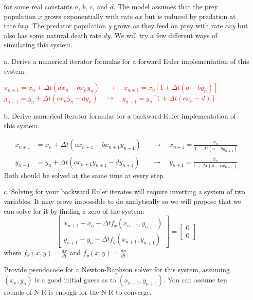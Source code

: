 \documentclass[11pt]{article}
\begin{document}
for some real constants $a$, $b$, $c$, and $d$.  The model assumes that the prey population $x$ grows exponentially with rate $ax$ but is reduced by predation at rate $bxy$.  The predator population $y$ grows as they feed on prey with rate $cxy$ but also has some natural death rate $dy$.  We will try a few different ways of simulating this system.  

a. Derive a numerical iterator formulas for a forward Euler implementation of this system.

\textcolor{red}{
$x_{n+1} = x_n + \Delta t (a x_n - b x_n y_n) \quad \rightarrow \quad x_{n+1} = x_n \left[1 + \Delta t (a - b y_n)\right]$\\
$y_{n+1} = y_n + \Delta t (c x_n y_n - d y_n) \quad \rightarrow \quad y_{n+1} = y_n \left[1 + \Delta t (c x_n - d)\right]$
}

b. Derive numerical iterator formulas for a backward Euler implementation of this system.

{\color{red}
\begin{align*}
x_{n+1} &= x_n + \Delta t (a x_{n+1} - b x_{n+1} y_{n+1})
  &&\rightarrow\quad x_{n+1} = \frac{x_n}{1 - \Delta t(a - b y_{n+1})}\\
y_{n+1} &= y_n + \Delta t (c x_{n+1} y_{n+1} - d y_{n+1})
  &&\rightarrow\quad y_{n+1} = \frac{y_n}{1 + \Delta t(d - c x_{n+1})}
\end{align*}
Both should be solved at the same time at every step.
}

c. Solving for your backward Euler iterates will require inverting a system of two variables.  It may prove impossible to do analytically so we will propose that we can solve for it by finding a zero of the system:
\[\left[ \begin{array}{c}x_{n+1} - x_n - \Delta t f_x(x_{n+1},y_{n+1})\\ y_{n+1} - y_n - \Delta t f_y(x_{n+1}, y_{n+1}) \end{array} \right]=
\left[ \begin{array}{c}0\\ 0 \end{array} \right] \]
where $f_x(x,y)=\frac{dx}{dt}$ and $f_y(x,y)=\frac{dy}{dt}$.

Provide pseudocode for a Newton-Raphson solver for this system, assuming $(x_n,y_n)$ is a good initial guess as to $(x_{n+1},y_{n+1})$.  You can assume ten rounds of N-R is enough for the N-R to converge.
\end{document}
